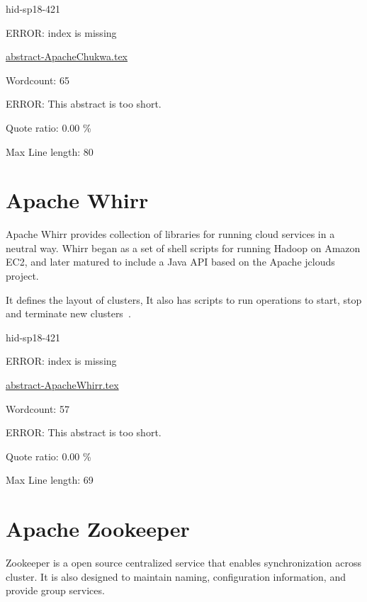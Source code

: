\begin{IU}

hid-sp18-421

ERROR: index is missing

\href{https://github.com/cloudmesh-community/hid-sp18-421/blob/master//technology/abstract-ApacheChukwa.tex}{abstract-ApacheChukwa.tex}

 

Wordcount: 65

ERROR: This abstract is too short.


Quote ratio: 0.00 \%
 
Max Line length: 80
\end{IU}

\section{Apache Whirr}

Apache Whirr provides collection of libraries for running cloud
services in a neutral way. Whirr began as a set of shell scripts for
running Hadoop on Amazon EC2, and later matured to include a Java API
based on the Apache jclouds project.

It defines the layout of clusters, It also has scripts to run
operations to start, stop and terminate new
clusters~\cite{hid-sp18-421-whirrCloud}.



\begin{IU}

hid-sp18-421

ERROR: index is missing

\href{https://github.com/cloudmesh-community/hid-sp18-421/blob/master//technology/abstract-ApacheWhirr.tex}{abstract-ApacheWhirr.tex}

 

Wordcount: 57

ERROR: This abstract is too short.


Quote ratio: 0.00 \%
 
Max Line length: 69
\end{IU}

\section{Apache Zookeeper}

Zookeeper is a open source centralized service that enables synchronization
across cluster. It is also designed to maintain naming, configuration
information, and provide  group services.

